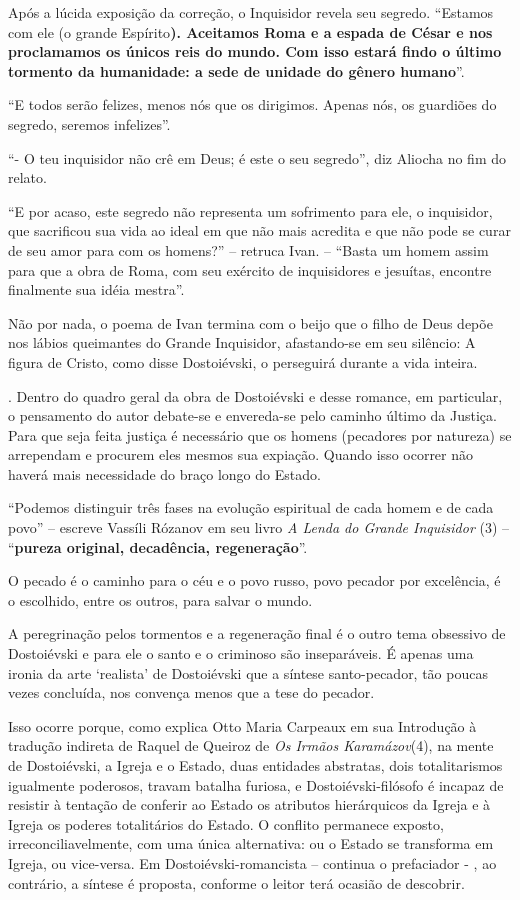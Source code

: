 Após a lúcida exposição da correção, o Inquisidor revela seu segredo.
``Estamos com ele (o grande Espírito\textbf{). Aceitamos Roma e a espada
de César e nos proclamamos os únicos reis do mundo. Com isso estará
findo o último tormento da humanidade: a sede de unidade do gênero
humano}''.

``E todos serão felizes, menos nós que os dirigimos. Apenas nós, os
guardiões do segredo, seremos infelizes''.

``- O teu inquisidor não crê em Deus; é este o seu segredo'', diz
Aliocha no fim do relato.

``E por acaso, este segredo não representa um sofrimento para ele, o
inquisidor, que sacrificou sua vida ao ideal em que não mais acredita e
que não pode se curar de seu amor para com os homens?'' -- retruca Ivan.
-- ``Basta um homem assim para que a obra de Roma, com seu exército de
inquisidores e jesuítas, encontre finalmente sua idéia mestra''.

Não por nada, o poema de Ivan termina com o beijo que o filho de Deus
depõe nos lábios queimantes do Grande Inquisidor, afastando-se em seu
silêncio: A figura de Cristo, como disse Dostoiévski, o perseguirá
durante a vida inteira.

. Dentro do quadro geral da obra de Dostoiévski e desse romance, em
particular, o pensamento do autor debate-se e envereda-se pelo caminho
último da Justiça. Para que seja feita justiça é necessário que os
homens (pecadores por natureza) se arrependam e procurem eles mesmos sua
expiação. Quando isso ocorrer não haverá mais necessidade do braço longo
do Estado.

``Podemos distinguir três fases na evolução espiritual de cada homem e
de cada povo'' -- escreve Vassíli Rózanov em seu livro \emph{A Lenda do
Grande Inquisidor} (3) -- ``\textbf{pureza original, decadência,
regeneração}''.

O pecado é o caminho para o céu e o povo russo, povo pecador por
excelência, é o escolhido, entre os outros, para salvar o mundo.

A peregrinação pelos tormentos e a regeneração final é o outro tema
obsessivo de Dostoiévski e para ele o santo e o criminoso são
inseparáveis. É apenas uma ironia da arte `realista' de Dostoiévski que
a síntese santo-pecador, tão poucas vezes concluída, nos convença menos
que a tese do pecador.

Isso ocorre porque, como explica Otto Maria Carpeaux em sua Introdução à
tradução indireta de Raquel de Queiroz de \emph{Os Irmãos Karamázov}(4),
na mente de Dostoiévski, a Igreja e o Estado, duas entidades abstratas,
dois totalitarismos igualmente poderosos, travam batalha furiosa, e
Dostoiévski-filósofo é incapaz de resistir à tentação de conferir ao
Estado os atributos hierárquicos da Igreja e à Igreja os poderes
totalitários do Estado. O conflito permanece exposto,
irreconciliavelmente, com uma única alternativa: ou o Estado se
transforma em Igreja, ou vice-versa. Em Dostoiévski-romancista --
continua o prefaciador - , ao contrário, a síntese é proposta, conforme
o leitor terá ocasião de descobrir.

